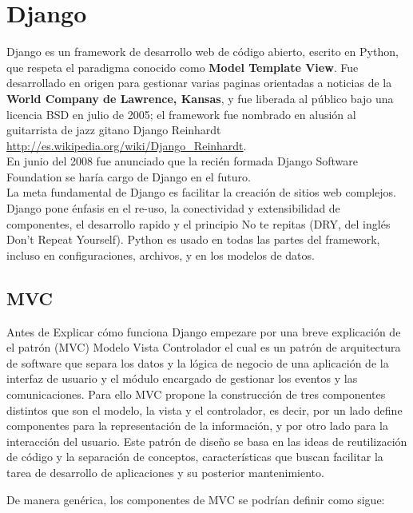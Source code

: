 \section{Django}

Django es un framework de desarrollo web de código abierto, escrito en Python, que respeta el paradigma conocido como {\bfseries Model Template View}. Fue desarrollado en origen para gestionar varias paginas orientadas a noticias de la {\bfseries World Company de Lawrence, Kansas}, y fue liberada al público bajo una licencia BSD en julio de 2005; el framework fue nombrado en alusión al guitarrista de jazz gitano Django Reinhardt \url{http://es.wikipedia.org/wiki/Django_Reinhardt}. \\[0.1cm]

En junio del 2008 fue anunciado que la recién formada Django Software Foundation se harí­a cargo de Django en el futuro. \\[0.1cm]

La meta fundamental de Django es facilitar la creación de sitios web complejos. Django pone énfasis en el re-uso, la conectividad y extensibilidad de componentes, el desarrollo rapido y el principio No te repitas
(DRY, del inglés Don't Repeat Yourself). Python es usado en todas las partes del framework, incluso en configuraciones, archivos, y en los modelos de datos. \\[0.1cm]


\subsection{MVC}

Antes de Explicar cómo funciona Django empezare por una breve explicación de el patrón (MVC) Modelo Vista Controlador el cual es un patrón de arquitectura de software que separa los datos y la lógica de negocio de una aplicación de la interfaz de usuario y el módulo encargado de gestionar los eventos y las comunicaciones. Para ello MVC propone la construcción de tres componentes distintos que son el modelo, la vista y el controlador, es decir, por un lado define componentes para la representación de la información, y por otro lado para la interacción  del usuario. Este patrón de diseño se basa en las ideas de reutilización de  código y la separación de conceptos, características que buscan facilitar la  tarea de desarrollo de aplicaciones y su posterior mantenimiento. 

De manera genérica, los componentes de MVC se podrí­an definir como sigue: \\[0.1cm]

